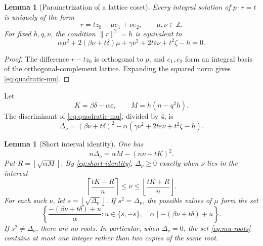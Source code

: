 \documentclass[11pt]{amsart}
\newtheorem{lemma}[theorem]{Lemma}
\theoremstyle{definition}
\theoremstyle{remark}
\newcommand{\Z}{\mathbb Z}
\newcommand{\ceil}[1]{\left\lceil #1\right\rceil}
\newcommand{\floor}[1]{\left\lfloor #1\right\rfloor}
\begin{document}
\begin{lemma}[Parametrization of a lattice coset]\label{lem:affine-coset}
Every integral solution of $p\cdot r=t$ is uniquely of the form
\[
 r=tz_0+\mu e_1+\nu e_2,
 \qquad \mu,\nu\in\Z.
\]
For fixed $h,q,\nu$, the condition $\|r\|^2=h$ is equivalent to
\begin{equation}\label{eq:quadratic-mu}
 \alpha\mu^2+2(\beta\nu+t\delta)\mu
 +\gamma\nu^2+2t\varepsilon\nu+t^2\zeta-h=0.
\end{equation}
\end{lemma}

\begin{proof}
The difference $r-tz_0$ is orthogonal to $p$, and $e_1,e_2$ form an integral
basis of the orthogonal-complement lattice.  Expanding the squared norm gives
\eqref{eq:quadratic-mu}.
\end{proof}

Let
\[
 K=\beta\delta-\alpha\varepsilon,
 \qquad
 M=h(n-q^2h).
\]
The discriminant of \eqref{eq:quadratic-mu}, divided by $4$, is
\[
 \Delta_\nu=(\beta\nu+t\delta)^2-
 \alpha(\gamma\nu^2+2t\varepsilon\nu+t^2\zeta-h).
\]

\begin{lemma}[Short interval identity]\label{lem:short-interval}
One has
\begin{equation}\label{eq:short-identity}
 n\Delta_\nu=\alpha M-(n\nu-tK)^2.
\end{equation}
Put $R=\floor{\sqrt{\alpha M}}$.  By \eqref{eq:short-identity},
$\Delta_\nu\ge0$ exactly when $\nu$ lies in the interval
\begin{equation}\label{eq:nu-interval}
 \ceil{\frac{tK-R}{n}}
 \le \nu\le
 \floor{\frac{tK+R}{n}}.
\end{equation}
For each such $\nu$, let $s=\floor{\sqrt{\Delta_\nu}}$.  If
$s^2=\Delta_\nu$, the possible values of $\mu$ form the set
\begin{equation}\label{eq:mu-roots}
 \left\{
 \frac{-(\beta\nu+t\delta)+u}{\alpha}:
 u\in\{s,-s\},\quad
 \alpha\mid-(\beta\nu+t\delta)+u
 \right\}.
\end{equation}
If $s^2\ne\Delta_\nu$, there are no roots.  In particular, when
$\Delta_\nu=0$, the set \eqref{eq:mu-roots} contains at most one integer
rather than two copies of the same root.
\end{lemma}
\end{document}
